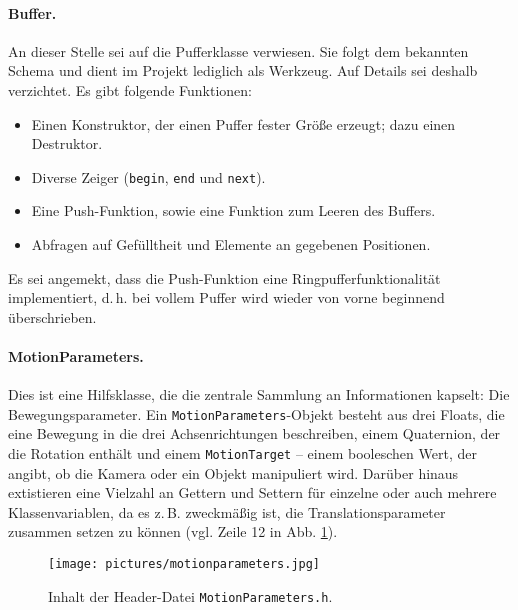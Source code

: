 	\paragraph{Buffer.} An dieser Stelle sei auf die Pufferklasse verwiesen. Sie folgt dem bekannten Schema und dient im Projekt lediglich als Werkzeug. Auf Details sei deshalb verzichtet. Es gibt folgende Funktionen:
	\begin{itemize}
	\item Einen Konstruktor, der einen Puffer fester Größe erzeugt; dazu einen Destruktor.
	\item Diverse Zeiger (\texttt{begin}, \texttt{end} und \texttt{next}).
	\item Eine Push-Funktion, sowie eine Funktion zum Leeren des Buffers.
	\item Abfragen auf Gefülltheit und Elemente an gegebenen Positionen.
	\end{itemize}
	Es sei angemekt, dass die Push-Funktion eine Ringpufferfunktionalität implementiert, d.\,h. bei vollem Puffer wird wieder von vorne beginnend überschrieben.\par\medskip
	\paragraph{MotionParameters.} Dies ist eine Hilfsklasse, die die zentrale Sammlung an Informationen kapselt: Die Bewegungsparameter. Ein \texttt{MotionParameters}-Objekt besteht aus drei Floats, die eine Bewegung in die drei Achsenrichtungen beschreiben, einem Quaternion, der die Rotation enthält und einem \glqq \texttt{MotionTarget}\grqq{} -- einem booleschen Wert, der angibt, ob die Kamera oder ein Objekt manipuliert wird. Darüber hinaus extistieren eine Vielzahl an Gettern und Settern für einzelne oder auch mehrere Klassenvariablen, da es z.\,B.  zweckmäßig ist, die Translationsparameter zusammen setzen zu können (vgl. Zeile 12 in Abb. \ref{fig:motpar}).
	\begin{figure}[h]
	\centering
	\texttt{[image: pictures/motionparameters.jpg]}
	\caption{Inhalt der Header-Datei \texttt{MotionParameters.h}.}\label{fig:motpar}
	\end{figure}\par\medskip
